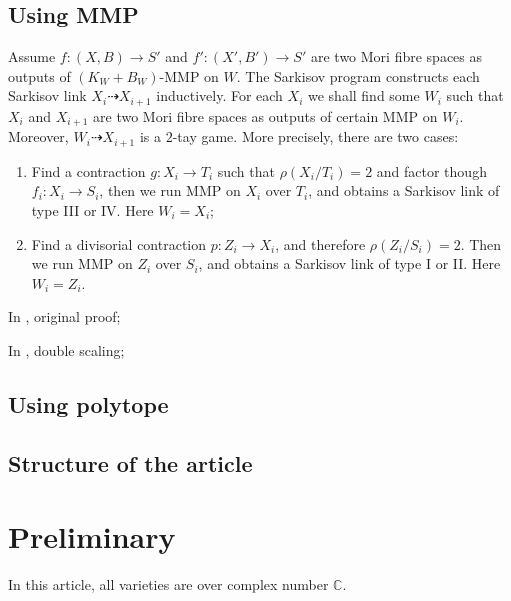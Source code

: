 \documentclass{article}
\begin{document}
\subsection{Using MMP}
Assume $f:(X,B)\to S'$ and $f':(X',B')\to S'$ are two Mori fibre spaces as outputs of $(K_{W}+B_{W})$-MMP on $W$. The Sarkisov program constructs each Sarkisov link $X_{i}\dashrightarrow X_{i+1}$ inductively. For each $X_{i}$ we shall find some $W_{i}$ such that $X_{i}$ and $X_{i+1}$ are two Mori fibre spaces as outputs of certain MMP on $W_{i}$. Moreover, $W_{i}\dashrightarrow X_{i+1}$ is a $2$-tay game. More precisely, there are two cases:
\begin{enumerate}
  \item Find a contraction $g:X_{i} \to T_{i}$ such that $\rho(X_{i}/T_{i})=2$ and factor though $f_{i}:X_{i} \to S_{i}$, then we run MMP on  $X_{i} $ over $T_{i}$, and obtains a Sarkisov link of type III or IV. Here $W_{i}=X_{i}$;
    \item  Find a divisorial contraction $p:Z_{i}\to X_{i}$, and therefore $\rho(Z_{i}/S_{i})=2$. Then we run MMP on $Z_{i}$ over $S_{i}$, and obtains a Sarkisov link of type I or II. Here $W_{i}=Z_{i}$. 
\end{enumerate}
In \cite{cortiFactoringBirationalMaps}, original proof; 

In \cite{haconMinimalModelProgram2012}, double scaling;


\subsection{Using polytope}

\subsection{Structure of the article}

\section{Preliminary}
In this article, all varieties are over complex number $\mathbb{C}$.
\end{document}
